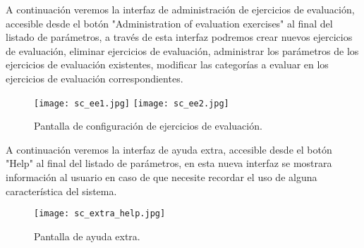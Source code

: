 A continuación veremos la interfaz de administración de ejercicios de evaluación, accesible desde el botón "Administration of evaluation exercises" al final del listado de parámetros, a través de esta interfaz podremos crear nuevos ejercicios de evaluación, eliminar ejercicios de evaluación, administrar los parámetros de los ejercicios de evaluación existentes, modificar las categorías a evaluar en los ejercicios de evaluación correspondientes.\\

\begin{figure}[h!]
	\centering
	\texttt{[image: sc\_ee1.jpg]}
	\texttt{[image: sc\_ee2.jpg]}
	\caption{Pantalla de configuración de ejercicios de evaluación.}
\end{figure}
\clearpage

A continuación veremos la interfaz de ayuda extra, accesible desde el botón "Help" al final del listado de parámetros,  en esta nueva interfaz se mostrara información al usuario en caso de que necesite recordar el uso de alguna característica del sistema.\\

\begin{figure}[h!]
	\centering
	\texttt{[image: sc\_extra\_help.jpg]}
	\caption{Pantalla de ayuda extra.}
\end{figure}
\clearpage